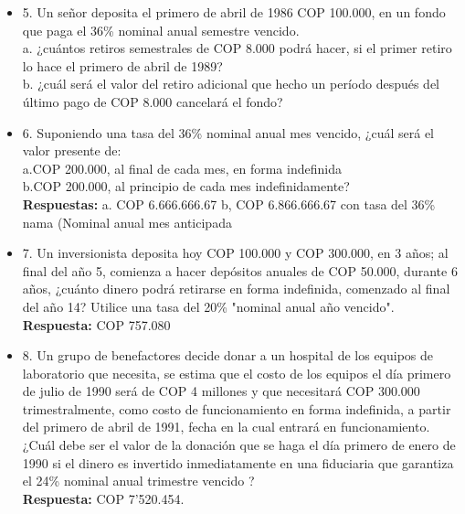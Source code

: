 \begin{itemize}
 \item 5. Un señor deposita el primero de abril de 1986 COP 100.000, en un fondo que paga el 36\% nominal anual semestre vencido.\\

       a. ¿cuántos retiros semestrales de COP 8.000 podrá hacer, si el primer retiro lo hace el primero de abril de 1989?\\
       b. ¿cuál será el valor del retiro adicional que hecho un período después del último pago de COP 8.000 cancelará el fondo?\\
       \medskip

 \item 6. Suponiendo una tasa del 36\% nominal anual mes vencido, ¿cuál será el valor presente de:\\

       a.COP 200.000, al final de cada mes, en forma indefinida\\
       b.COP 200.000, al principio de cada mes indefinidamente?\\
       \textbf{Respuestas:} a. COP 6.666.666.67 \hspace{0,5 cm}b, COP 6.866.666.67 con tasa del 36\% nama (Nominal anual mes anticipada\\
       \medskip

 \item 7. Un inversionista deposita hoy COP 100.000 y COP 300.000, en 3 años; al final del año 5, comienza a hacer depósitos anuales de COP 50.000, durante 6 años, ¿cuánto dinero podrá retirarse en forma indefinida, comenzado al final del año 14? Utilice una tasa del 20\% "nominal anual año vencido".\\
       \textbf{Respuesta:} COP 757.080\\
       \medskip

 \item 8. Un grupo de benefactores decide donar a un hospital de los equipos de laboratorio que necesita, se estima que el costo de los equipos el día primero de julio de 1990 será de COP 4 millones y que necesitará COP 300.000 trimestralmente, como costo de funcionamiento en forma indefinida, a partir del primero de abril de 1991, fecha en la cual entrará en funcionamiento. ¿Cuál debe ser el valor de la donación que se haga el día primero de enero de 1990 si el dinero es invertido inmediatamente en una fiduciaria que garantiza el 24\%  nominal anual trimestre vencido ?\\
       \textbf{Respuesta:} COP 7'520.454.\\
       \medskip


\end{itemize}
